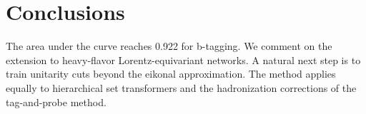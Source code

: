 \section{Conclusions}\label{sec:conclusions}

The area under the curve reaches 0.922 for b-tagging. We comment on the
extension to heavy-flavor Lorentz-equivariant networks. A natural next
step is to train unitarity cuts beyond the eikonal approximation. The
method applies equally to hierarchical set transformers and the
hadronization corrections of the tag-and-probe method.

